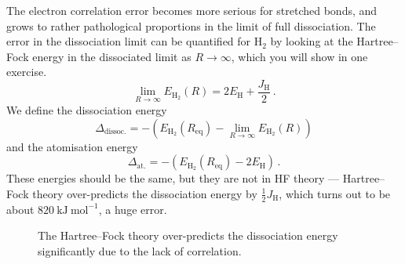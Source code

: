\documentclass{article}
\theoremstyle{plain}\theoremheaderfont{\normalfont\itshape}\theorembodyfont{\rmfamily}\theoremseparator{.}\newtheorem*{rem}{Remark}\newtheorem*{ex}{Example}\newtheorem*{proof}{Proof}\newtheorem*{altp}{Alternative proof}
\theoremstyle{plain}\theoremheaderfont{\normalfont\bfseries}\theorembodyfont{\rmfamily}\theoremseparator{.}\newtheorem{thm}{Theorem}[section]\newtheorem{lem}[thm]{Lemma}\newtheorem{prop}[thm]{Proposition}\newtheorem*{cor}{Corollary}\newtheorem{defn}[thm]{Definition}\newtheorem{clm}[thm]{Claim}\newtheorem{clminproof}{Claim}\newtheorem{pos}{Postulate}[section]
\theoremstyle{break}\theoremheaderfont{\normalfont\itshape}\theorembodyfont{\rmfamily}\theoremseparator{.\medskip}\newtheorem*{proofskip}{Proof}\newtheorem*{exs}{Examples}\newtheorem*{rems}{Remarks}
\theoremstyle{break}\theoremheaderfont{\normalfont\bfseries}\theorembodyfont{\rmfamily}\theoremseparator{.\medskip}\newtheorem{lemskip}[thm]{Lemma}\newtheorem{defnskip}[thm]{Definition}\newtheorem{propskip}[thm]{Proposition}\newtheorem{thmskip}[thm]{Theorem}
\numberwithin{equation}{section}
\newcommand{\unit}[1]{\ \mathrm{#1}}
\begin{document}
    The electron correlation error becomes more serious for stretched bonds, and grows to rather pathological proportions in the limit of full dissociation. The error in the dissociation limit can be quantified for \(\mathrm{H_2}\) by looking at the Hartree--Fock energy in the dissociated limit as \(R\to\infty\), which you will show in one exercise.
    \begin{equation}
        \lim_{R\to\infty}E_{\mathrm{H_2}}(R)=2E_{\mathrm{H}}+\frac{J_{\mathrm{H}}}{2}\,.
    \end{equation}
    We define the dissociation energy
    \begin{equation}
        \Delta_{\text{dissoc.}}=-\left(E_{\mathrm{H_2}}(R_{\text{eq}})-\lim_{R\to\infty}E_{\mathrm{H_2}}(R)\right)
    \end{equation}
    and the atomisation energy
    \begin{equation}
        \Delta_{\text{at.}}=-\left(E_{\mathrm{H_2}}(R_{\text{eq}})-2E_{\mathrm{H}}\right)\,.
    \end{equation}
    These energies should be the same, but they are not in HF theory --- Hartree--Fock theory over-predicts the dissociation energy by \(\frac{1}{2}J_{\mathrm{H}}\), which turns out to be about \(820\unit{kJ}\unit{mol}^{-1}\), a huge error.

    \begin{figure}
        \centering
        \caption{The Hartree--Fock theory over-predicts the dissociation energy significantly due to the lack of correlation.}
    \end{figure}
\end{document}
